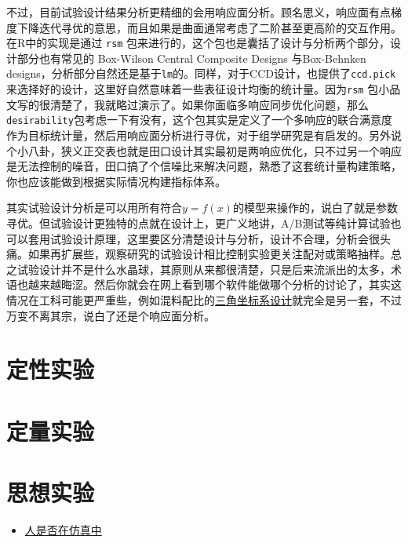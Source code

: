 \documentclass[]{tufte-book}
\providecommand{\tightlist}{%
  \setlength{\itemsep}{0pt}\setlength{\parskip}{0pt}}
\begin{document}
不过，目前试验设计结果分析更精细的会用响应面分析。顾名思义，响应面有点梯度下降迭代寻优的意思，而且如果是曲面通常考虑了二阶甚至更高阶的交互作用。在R中的实现是通过 \texttt{rsm} 包来进行的，这个包也是囊括了设计与分析两个部分，设计部分也有常见的 Box-Wilson Central Composite Designs 与Box-Behnken designs，分析部分自然还是基于\texttt{lm}的。同样，对于CCD设计，也提供了\texttt{ccd.pick}来选择好的设计，这里好自然意味着一些表征设计均衡的统计量。因为\texttt{rsm} 包小品文写的很清楚了，我就略过演示了。如果你面临多响应同步优化问题，那么\texttt{desirability}包考虑一下有没有，这个包其实是定义了一个多响应的联合满意度作为目标统计量，然后用响应面分析进行寻优，对于组学研究是有启发的。另外说个小八卦，狭义正交表也就是田口设计其实最初是两响应优化，只不过另一个响应是无法控制的噪音，田口搞了个信噪比来解决问题，熟悉了这套统计量构建策略，你也应该能做到根据实际情况构建指标体系。

其实试验设计分析是可以用所有符合\(y = f(x)\)的模型来操作的，说白了就是参数寻优。但试验设计更独特的点就在设计上，更广义地讲，A/B测试等纯计算试验也可以套用试验设计原理，这里要区分清楚设计与分析，设计不合理，分析会很头痛。如果再扩展些，观察研究的试验设计相比控制实验更关注配对或策略抽样。总之试验设计并不是什么水晶球，其原则从来都很清楚，只是后来流派出的太多，术语也越来越晦涩。然后你就会在网上看到哪个软件能做哪个分析的讨论了，其实这情况在工科可能更严重些，例如混料配比的\href{https://support.minitab.com/zh-cn/minitab/18/help-and-how-to/modeling-statistics/doe/supporting-topics/mixture-designs/what-is-a-mixture-design/}{三角坐标系设计}就完全是另一套，不过万变不离其宗，说白了还是个响应面分析。

\hypertarget{ux5b9aux6027ux5b9eux9a8c}{%
\section{定性实验}\label{ux5b9aux6027ux5b9eux9a8c}}

\hypertarget{ux5b9aux91cfux5b9eux9a8c}{%
\section{定量实验}\label{ux5b9aux91cfux5b9eux9a8c}}

\hypertarget{ux601dux60f3ux5b9eux9a8c}{%
\section{思想实验}\label{ux601dux60f3ux5b9eux9a8c}}

\begin{itemize}
\tightlist
\item
  \href{https://www.vox.com/technology/2016/6/23/12007694/elon-musk-simulation-cartoon}{人是否在仿真中}
\end{itemize}
\end{document}
